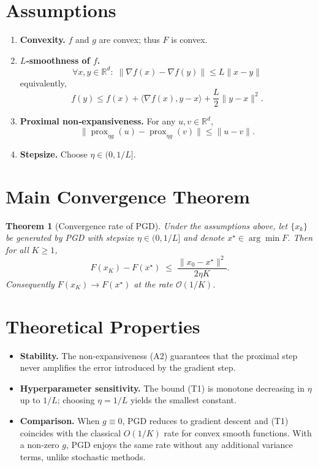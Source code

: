 \documentclass{article}
\newtheorem{theorem}{Theorem}[section]
\begin{document}
\newpage
\section*{Assumptions}
\begin{enumerate}
\item \textbf{Convexity.} $f$ and $g$ are convex; thus $F$ is convex.
\item \textbf{$L$‑smoothness of $f$.}
\[
\forall x,y\in\mathbb{R}^d:\;
\|\nabla f(x)-\nabla f(y)\|\le L\|x-y\|
\]
equivalently,
\[
f(y)\le f(x)+\langle\nabla f(x),y-x\rangle+\frac{L}{2}\|y-x\|^2 .
\tag{A1}
\]
\item \textbf{Proximal non‑expansiveness.} For any $u,v\in\mathbb{R}^d$,
\[
\big\|\operatorname{prox}_{\eta g}(u)-\operatorname{prox}_{\eta g}(v)\big\|
\le\|u-v\|.
\tag{A2}
\]
\item \textbf{Stepsize.} Choose $\eta\in(0,1/L]$.
\end{enumerate}

\section*{Main Convergence Theorem}
\begin{theorem}[Convergence rate of PGD]\label{thm:pgd}
Under the assumptions above, let $\{x_k\}$ be generated by PGD with stepsize
$\eta\in(0,1/L]$ and denote $x^\star\in\arg\min F$. Then for all $K\ge1$,
\[
F(x_K)-F(x^\star)\;\le\;\frac{\|x_0-x^\star\|^2}{2\eta K}.
\tag{T1}
\]
Consequently $F(x_K)\to F(x^\star)$ at the rate $\mathcal{O}(1/K)$.
\end{theorem}

\section*{Theoretical Properties}
\begin{itemize}
\item \textbf{Stability.} The non‑expansiveness (A2) guarantees that the proximal step never amplifies the error introduced by the gradient step.
\item \textbf{Hyperparameter sensitivity.} The bound (T1) is monotone decreasing in $\eta$ up to $1/L$; choosing $\eta=1/L$ yields the smallest constant.
\item \textbf{Comparison.} When $g\equiv0$, PGD reduces to gradient descent and (T1) coincides with the classical $O(1/K)$ rate for convex smooth functions. With a non‑zero $g$, PGD enjoys the same rate without any additional variance terms, unlike stochastic methods.
\end{itemize}
\end{document}
